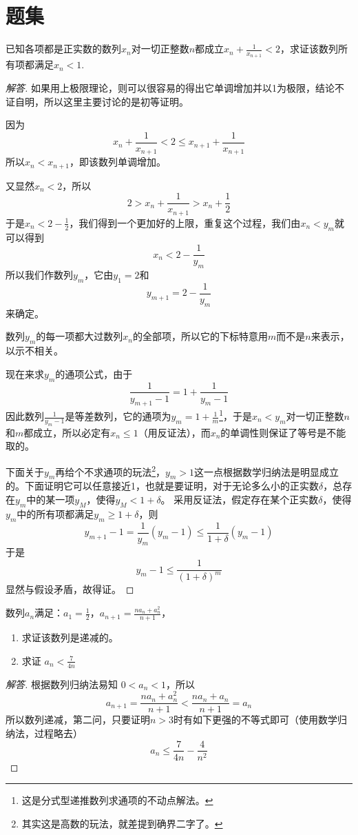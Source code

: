 
\section{题集}
\label{sec:number-sequence-exercise}
\begin{exercise}
  已知各项都是正实数的数列$x_n$对一切正整数$n$都成立$x_n+\frac{1}{x_{n+1}}<2$，求证该数列所有项都满足$x_n<1$.
\end{exercise}
\begin{proof}[解答]
  如果用上极限理论，则可以很容易的得出它单调增加并以1为极限，结论不证自明，所以这里主要讨论的是初等证明。

因为
$$
x_n+\frac{1}{x_{n+1}}<2 \leqslant 
x_{n+1}+\frac{1}{x_{n+1}}
$$
所以$x_n<x_{n+1}$，即该数列单调增加。

又显然$x_n<2$，所以
$$
2>x_n+\frac{1}{x_{n+1}}>x_n+\frac{1}{2}
$$
于是$x_n<2-\frac{1}{2}$，我们得到一个更加好的上限，重复这个过程，我们由$x_n<y_m$就可以得到
$$
x_n<2-\frac{1}{y_m}
$$
所以我们作数列$y_m$，它由$y_1=2$和
$$
y_{m+1}=2-\frac{1}{y_m}
$$
来确定。

数列$y_m$的每一项都大过数列$x_n$的全部项，所以它的下标特意用$m$而不是$n$来表示，以示不相关。

现在来求$y_m$的通项公式，由于
$$
\frac{1}{y_{m+1}-1}=1+\frac{1}{y_{m}-1}
$$
因此数列$\frac{1}{y_m-1}$是等差数列，它的通项为$y_m=1+\frac{1}{m}$\footnote{这是分式型递推数列求通项的不动点解法。}，于是$x_n<y_m$对一切正整数$n$和$m$都成立，所以必定有$x_n\leqslant 1$（用反证法），而$x_n$的单调性则保证了等号是不能取的。

下面关于$y_m$再给个不求通项的玩法\footnote{其实这是高数的玩法，就差提到确界二字了。}，$y_m>1$这一点根据数学归纳法是明显成立的。下面证明它可以任意接近1，也就是要证明，对于无论多么小的正实数$\delta$，总存在$y_m$中的某一项$y_M$，使得$y_M<1+\delta$。
采用反证法，假定存在某个正实数$\delta$，使得$y_m$中的所有项都满足$y_m\geqslant 1+\delta$，则
$$
y_{m+1}-1=\frac{1}{y_m}(y_m-1)\leqslant 
\frac{1}{1+\delta}(y_m-1)
$$
于是
$$
y_m-1\leqslant \frac{1}{(1+\delta)^m}
$$
显然与假设矛盾，故得证。
\end{proof}

\begin{exercise}
  数列$a_n$满足：$a_1=\frac{1}{2}$，$a_{n+1}=\frac{na_n+a_n^2}{n+1}$，
  \begin{enumerate}
  \item 求证该数列是递减的。
  \item 求证 $a_n < \frac{7}{4n}$
  \end{enumerate}
\end{exercise}
\begin{proof}[解答]
  根据数列归纳法易知 $0<a_n<1$，所以
  \begin{equation*}
    a_{n+1}=\frac{na_n+a_n^2}{n+1} < \frac{na_n+a_n}{n+1} = a_n
  \end{equation*}
  所以数列递减，第二问，只要证明$n>3$时有如下更强的不等式即可（使用数学归纳法，过程略去）
  \begin{equation*}
    a_n \leqslant \frac{7}{4n}-\frac{4}{n^2}
  \end{equation*}
\end{proof}


